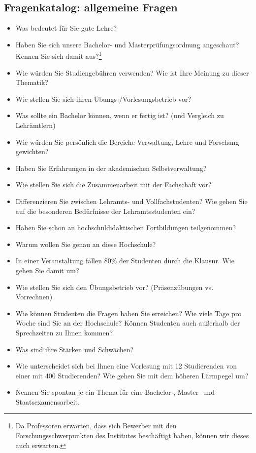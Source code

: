 \subsection{Fragenkatalog: allgemeine Fragen}
\begin{itemize}
    \item Was bedeutet für Sie gute Lehre?
    \item Haben Sie sich unsere Bachelor- und Masterprüfungsordnung angeschaut? Kennen Sie sich damit aus?\footnote{Da Professoren erwarten, dass sich Bewerber mit den Forschungsschwerpunkten des Institutes beschäftigt haben, können wir dieses auch erwarten.}
    \item Wie würden Sie Studiengebühren verwenden? Wie ist Ihre Meinung zu dieser Thematik?
    \item Wie stellen Sie sich ihren Übungs-/Vorlesungsbetrieb vor?
    \item Was sollte ein Bachelor können, wenn er fertig ist? (und Vergleich zu Lehrämtlern)
    \item Wie würden Sie persönlich die Bereiche Verwaltung, Lehre und Forschung gewichten?
    \item Haben Sie Erfahrungen in der akademischen Selbstverwaltung?
    \item Wie stellen Sie sich die Zusammenarbeit mit der Fachschaft vor?
    \item Differenzieren Sie zwischen Lehramts- und Vollfachstudenten? Wie gehen Sie auf die besonderen Bedürfnisse der Lehramtsstudenten ein?
    \item Haben Sie schon an hochschuldidaktischen Fortbildungen teilgenommen?
    \item Warum wollen Sie genau an diese Hochschule?
    \item In einer Veranstaltung fallen 80\% der Studenten durch die Klausur. Wie gehen Sie damit um?
    \item Wie stellen Sie sich den Übungsbetrieb vor? (Präsenzübungen vs. Vorrechnen)
    \item Wie können Studenten die Fragen haben Sie erreichen? Wie viele Tage pro Woche sind Sie an der Hochschule? Können Studenten auch außerhalb der Sprechzeiten zu Ihnen kommen?
    \item Was sind ihre Stärken und Schwächen?
    \item Wie unterscheidet sich bei Ihnen eine Vorlesung mit 12 Studierenden von einer mit 400 Studierenden? Wie gehen Sie mit dem höheren Lärmpegel um?
    \item Nennen Sie spontan je ein Thema für eine Bachelor-, Master- und Staatsexamensarbeit.

\end{itemize}
